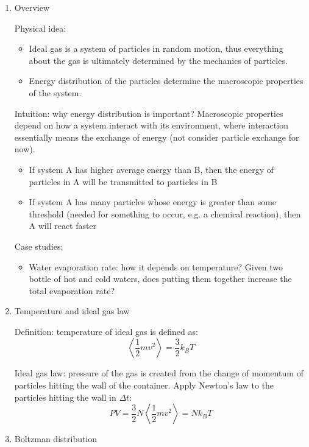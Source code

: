 \documentclass{report}
\begin{document}
\begin{enumerate}
\item{Overview}

Physical idea: 
\begin{itemize}
\item{}Ideal gas is a system of particles in random motion, thus everything about the gas is ultimately determined by the mechanics of particles. 
\item{}Energy distribution of the particles determine the macroscopic properties of the system. 
\end{itemize}

Intuition: why energy distribution is important? Macroscopic properties depend on how a system interact with its environment, where interaction essentially means the exchange of energy (not consider particle exchange for now).
\begin{itemize}
\item{}If system A has higher average energy than B, then the energy of particles in A will be transmitted to particles in B
\item{}If system A has many particles whose energy is greater than some threshold (needed for something to occur, e.g. a chemical reaction), then A will react faster
\end{itemize}

Case studies: 
\begin{itemize}
\item Water evaporation rate: how it depends on temperature? Given two bottle of hot and cold waters, does putting them together increase the total evaporation rate? 
\end{itemize}

\item{Temperature and ideal gas law}

Definition: temperature of ideal gas is defined as: 
\begin{equation}
\left\langle \frac{1}{2}mv^2 \right\rangle = \frac{3}{2}k_B T
\end{equation}

Ideal gas law: pressure of the gas is created from the change of momentum of particles hitting the wall of the container. Apply Newton's law to the particles hitting the wall in $\Delta t$: 
\begin{equation}
PV = \frac{3}{2}N \left\langle \frac{1}{2}mv^2 \right\rangle = N k_B T
\end{equation}

\item{Boltzman distribution}


\end{enumerate}
\end{document}
